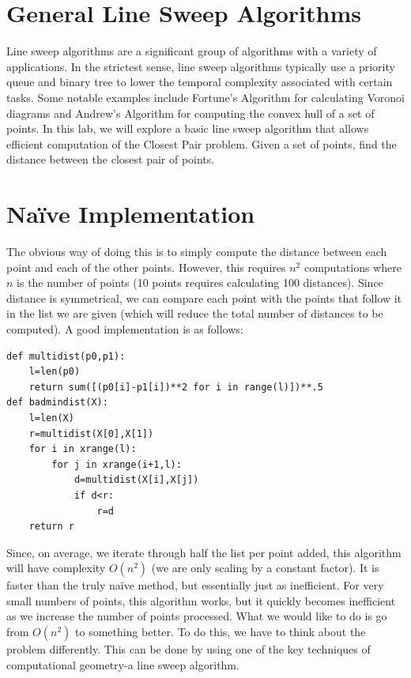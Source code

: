 

\section*{General Line Sweep Algorithms}

Line sweep algorithms are a significant group of algorithms with a variety of applications. 
In the strictest sense, line sweep algorithms typically use a priority queue and binary tree to lower the temporal complexity associated with certain tasks. 
Some notable examples include Fortune's Algorithm for calculating Voronoi diagrams and Andrew's Algorithm for computing the convex hull of a set of points. 
In this lab, we will explore a basic line sweep algorithm that allows efficient computation of the Closest Pair problem.  
Given a set of points, find the distance between the closest pair of points.

\section*{Na\"ive Implementation}

The obvious way of doing this is to simply compute the distance between each point and each of the other points.
However, this requires $n^2$ computations where $n$ is the number of points (10 points requires calculating 100 distances).
Since distance is symmetrical, we can compare each point with the points that follow it in the list we are given (which will reduce
the total number of distances to be computed).
A good implementation is as follows:
\begin{lstlisting}
def multidist(p0,p1):
    l=len(p0)
    return sum([(p0[i]-p1[i])**2 for i in range(l)])**.5
def badmindist(X):
    l=len(X)
    r=multidist(X[0],X[1])
    for i in xrange(l):
        for j in xrange(i+1,l):
            d=multidist(X[i],X[j])
            if d<r:
                r=d
    return r
\end{lstlisting}

Since, on average, we iterate through half the list per point added, this algorithm will have complexity $O(n^2)$ (we are only scaling by a constant factor).  
It is faster than the truly na\"ive method, but essentially just as inefficient.
For very small numbers of points, this algorithm works, but it quickly becomes inefficient as we increase the number of points processed.  
What we would like to do is go from $O(n^2)$ to something better.  
To do this, we have to think about the problem differently.
This can be done by using one of the key techniques of computational geometry-a line sweep algorithm.

